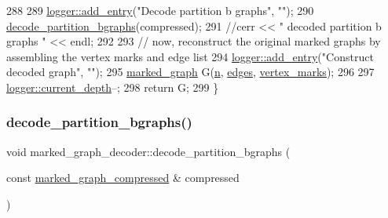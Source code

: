 \begin{DoxyCode}
288 
289   \hyperlink{classlogger_a710163deb17bc81f70d53d285b8ac9ac}{logger::add\_entry}(\textcolor{stringliteral}{"Decode partition b graphs"}, \textcolor{stringliteral}{""});
290   \hyperlink{classmarked__graph__decoder_aea53529191c7d56a897620b3d842ffaa}{decode\_partition\_bgraphs}(compressed);
291   \textcolor{comment}{//cerr << " decoded partition b graphs " << endl;}
292 
293   \textcolor{comment}{// now, reconstruct the original marked graphs by assembling the vertex marks and edge list}
294   \hyperlink{classlogger_a710163deb17bc81f70d53d285b8ac9ac}{logger::add\_entry}(\textcolor{stringliteral}{"Construct decoded graph"}, \textcolor{stringliteral}{""});
295   \hyperlink{classmarked__graph}{marked\_graph} G(\hyperlink{classmarked__graph__decoder_aefc93611bc4a3e9a5d3956d97649a0e9}{n}, \hyperlink{classmarked__graph__decoder_af9e75da0a495d9c3bdcd169e15e3261e}{edges}, \hyperlink{classmarked__graph__decoder_a98be932a5abff7efbc8dd4290268b69a}{vertex\_marks});
296 
297   \hyperlink{classlogger_a9d29b49bd318a719a8e85b59eac54fe0}{logger::current\_depth}--;
298   \textcolor{keywordflow}{return} G;
299 \}
\end{DoxyCode}
\mbox{\label{classmarked__graph__decoder_aea53529191c7d56a897620b3d842ffaa}} 
\subsubsection{\texorpdfstring{decode\+\_\+partition\+\_\+bgraphs()}{decode\_partition\_bgraphs()}}
{\footnotesize\ttfamily void marked\+\_\+graph\+\_\+decoder\+::decode\+\_\+partition\+\_\+bgraphs (\begin{DoxyParamCaption}\item[{const \hyperlink{classmarked__graph__compressed}{marked\+\_\+graph\+\_\+compressed} \&}]{compressed }\end{DoxyParamCaption})\hspace{0.3cm}{\ttfamily [private]}}


